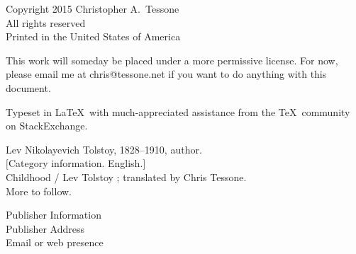 \begingroup 
\footnotesize 
\parindent 0pt 
\parskip \baselineskip 
Copyright \textcopyright{} 2015 Christopher A.~Tessone \\
All rights reserved \\
Printed in the United States of America %

This work will someday be placed under a more permissive license. For 
now, please email me at chris@tessone.net if you want to do anything 
with this document. 

Typeset in \LaTeX\ with much-appreciated assistance from the \TeX\
community on StackExchange. %


Lev Nikolayevich Tolstoy, 1828--1910, author. \\
$[$Category information. English.$]$ \\
Childhood / Lev Tolstoy ; translated by Chris Tessone. \\
More to follow. 

\vfill 

Publisher Information\\
Publisher Address\\
Email or web presence 

\endgroup 
\pagestyle{empty}
\clearpage 

